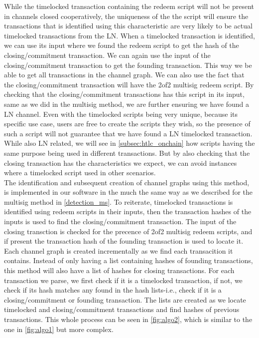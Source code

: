 While the timelocked transaction containing the redeem script will not be present in channels closed cooperatively, 
the uniqueness of the the script will ensure the transactions that is identified using this characteristic are very likely to be actual timelocked transactions from the LN.
When a timelocked transaction is identified, we can use its input where we found the redeem script to get the hash of the closing/commitment transaction.
We can again use the input of the closing/commitment transaction to get the founding transaction. 
This way we be able to get all transactions in the channel graph.
We can also use the fact that the closing/commitment transaction will have the 2of2 multisig redeem script.
By checking that the closing/commitment transactions has this script in its input, same as we did in the multisig method, we are further ensuring we have found a LN channel.
Even with the timelocked scripts being very unique, because its specific use case, users are free to create the scripts they wish, so the presence of such a script will not guarantee that we have found a LN timelocked transaction.
While also LN related, we will see in \cref{subsec:htlc_onchain} how scripts having the same purpose being used in different transactions.
But by also checking that the closing transaction has the characteristics we expect, we can avoid instances where a timelocked script used in other scenarios.
\\

The identification and subsequent creation of channel graphs using this method, is implemented in our software in the much the same way as we described for the multisig method in \cref{detection_ms}.
To reiterate, timelocked transactions is identified using redeem scripts in their inputs, then the transaction hashes of the inputs is used to find the closing/commitment transaction.
The input of the closing transction is checked for the precence of 2of2 multisig redeem scripts, and if present the transaction hash of the founding transaction is used to locate it.
Each channel graph is created incrementally as we find each transacition it contains.
Instead of only having a list containing hashes of founding transactions, this method will also have a list of hashes for closing transactions.
For each transaction we parse, we first check if it is a timelocked transaction, if not, we check if its hash matches any found in the hash lists-i.e., check if it is a closing/commitment or founding transaction.
The lists are created as we locate timelocked and closing/commitment transactions and find hashes of previous transactions.
This whole process can be seen in \cref{fig:algo2}, which is similar to the one in \cref{fig:algo1} but more complex.

